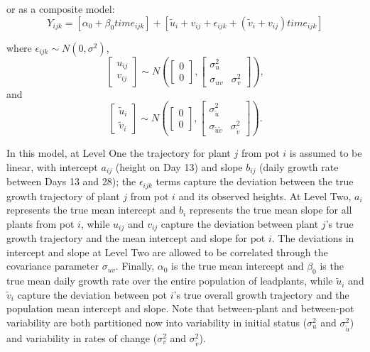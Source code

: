 \documentclass[
]{krantz}
\begin{document}
or as a composite model:
\begin{equation}
Y_{ijk}=[\alpha_{0}+\beta_{0}\textstyle{time}_{ijk}]+
[\tilde{u}_{i}+{v}_{ij}+\epsilon_{ijk}+(\tilde{v}_{i}+{v}_{ij})\textstyle{time}_{ijk}]
\label{eq:compmodb}
\end{equation}

where \(\epsilon_{ijk}\sim N(0,\sigma^2)\),
\[ \left[ \begin{array}{c}
            u_{ij} \\ v_{ij}
          \end{array}  \right] \sim N \left( \left[
          \begin{array}{c}
            0 \\ 0
          \end{array} \right], \left[
          \begin{array}{cc}
            \sigma_{u}^{2} & \\
            \sigma_{uv} & \sigma_{v}^{2}
          \end{array} \right] \right), \] and
\[ \left[ \begin{array}{c}
            \tilde{u}_{i} \\ \tilde{v}_{i}
          \end{array}  \right] \sim N \left( \left[
          \begin{array}{c}
            0 \\ 0
          \end{array} \right], \left[
          \begin{array}{cc}
            \sigma_{\tilde{u}}^{2} & \\
            \sigma_{\tilde{u}\tilde{v}} & \sigma_{\tilde{v}}^{2}
          \end{array} \right] \right). \]

In this model, at Level One the trajectory for plant \(j\) from pot \(i\) is assumed to be linear, with intercept \(a_{ij}\) (height on Day 13) and slope \(b_{ij}\) (daily growth rate between Days 13 and 28); the \(\epsilon_{ijk}\) terms capture the deviation between the true growth trajectory of plant \(j\) from pot \(i\) and its observed heights. At Level Two, \(a_{i}\) represents the true mean intercept and \(b_{i}\) represents the true mean slope for all plants from pot \(i\), while \(u_{ij}\) and \(v_{ij}\) capture the deviation between plant \(j\)'s true growth trajectory and the mean intercept and slope for pot \(i\). The deviations in intercept and slope at Level Two are allowed to be correlated through the covariance parameter \(\sigma_{uv}\). Finally, \(\alpha_{0}\) is the true mean intercept and \(\beta_{0}\) is the true mean daily growth rate over the entire population of leadplants, while \(\tilde{u}_{i}\) and \(\tilde{v}_{i}\) capture the deviation between pot \(i\)'s true overall growth trajectory and the population mean intercept and slope. Note that between-plant and between-pot variability are both partitioned now into variability in initial status (\(\sigma_{u}^{2}\) and \(\sigma_{\tilde{u}}^{2}\)) and variability in rates of change (\(\sigma_{v}^{2}\) and \(\sigma_{\tilde{v}}^{2}\)).
\end{document}
